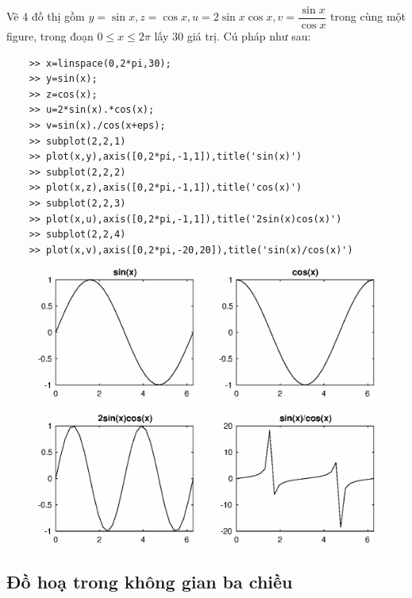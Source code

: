 \documentclass[12pt,a4paper]{article}
\begin{document}
\begin{example}
	Vẽ 4 đồ thị gồm $y=\sin{x} , z=\cos{x} , u=2 \sin{x} \cos{x} , v= \dfrac{\sin{x}}{\cos{x}}$ trong cùng một figure, trong đoạn $0 \leq x \leq 2\pi$ lấy 30 giá trị. Cú pháp như sau:
\begin{lstlisting}
	>> x=linspace(0,2*pi,30);
	>> y=sin(x);
	>> z=cos(x);
	>> u=2*sin(x).*cos(x);
	>> v=sin(x)./cos(x+eps);
	>> subplot(2,2,1)
	>> plot(x,y),axis([0,2*pi,-1,1]),title('sin(x)')
	>> subplot(2,2,2)
	>> plot(x,z),axis([0,2*pi,-1,1]),title('cos(x)')
	>> subplot(2,2,3)
	>> plot(x,u),axis([0,2*pi,-1,1]),title('2sin(x)cos(x)')
	>> subplot(2,2,4)
	>> plot(x,v),axis([0,2*pi,-20,20]),title('sin(x)/cos(x)')
\end{lstlisting}
\begin{center}
	\begin{figure}[H]
	\begin{center}
		\includegraphics[scale=1]{hinhtieuluan/dothi14}
	\end{center}
		\caption{}
		\label{refdothi14}
	\end{figure}
\end{center}
\end{example}
\subsection{Đồ hoạ trong không gian ba chiều}
\end{document}
